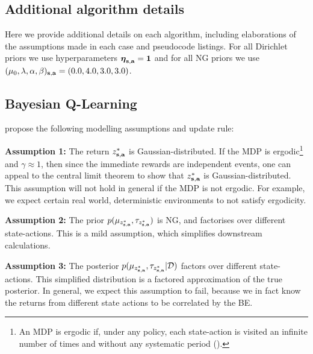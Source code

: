 \documentclass{article}
\begin{document}
\clearpage
\begin{appendices}
\section{Additional algorithm details}

Here we provide additional details on each algorithm, including elaborations of the assumptions made in each case and pseudocode listings. For all Dirichlet priors we use hyperparameters $\boldsymbol{\eta}_{\mathbf{s}, \mathbf{a}} = \mathbf{1}$ and for all NG priors we use $(\mu_0, \lambda, \alpha, \beta)_{\mathbf{s}, \mathbf{a}} = (0.0, 4.0, 3.0, 3.0)$.

\subsection{Bayesian Q-Learning} \label{app:bql}

\cite{bqlearning} propose the following modelling assumptions and update rule:

\textbf{Assumption 1:} The return $z^*_{\mathbf{s}, \mathbf{a}}$ is Gaussian-distributed. If the MDP is ergodic\footnote{An MDP is ergodic if, under any policy, each state-action is visited an infinite number of times and without any systematic period (\cite{silver}).} and $\gamma \approx 1$, then since the immediate rewards are independent events, one can appeal to the central limit theorem to show that $z^*_{\mathbf{s}, \mathbf{a}}$ is Gaussian-distributed. This assumption will not hold in general if the MDP is not ergodic. For example, we expect certain real world, deterministic environments to not satisfy ergodicity.

\textbf{Assumption 2:} The prior $p(\mu_{z^*_{\mathbf{s}, \mathbf{a}}}, \tau_{z^*_{\mathbf{s}, \mathbf{a}}})$ is NG, and factorises over different state-actions. This is a mild assumption, which simplifies downstream calculations.

\textbf{Assumption 3:} The posterior $p(\mu_{z^*_{\mathbf{s}, \mathbf{a}}}, \tau_{z^*_{\mathbf{s}, \mathbf{a}}}| \mathcal{D})$ factors over different state-actions. This simplified distribution is a factored approximation of the true posterior. In general, we expect this assumption to fail, because we in fact know the returns from different state actions to be correlated by the BE.


\end{appendices}
\end{document}
